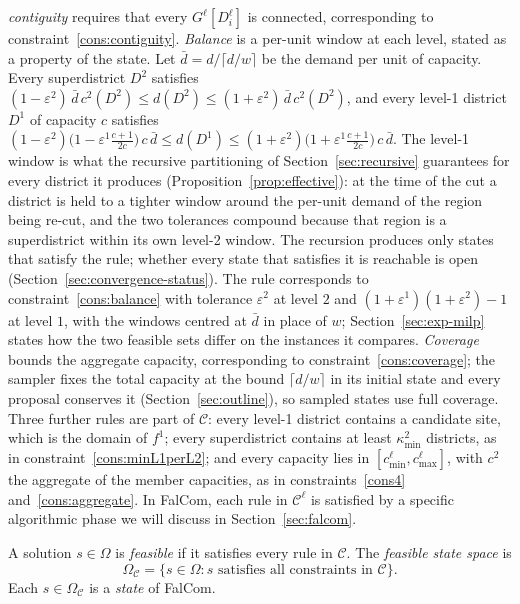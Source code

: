 \documentclass[preprint,12pt,authoryear]{elsarticle}
\theoremstyle{definition}
\begin{document}
\emph{contiguity} requires that every $G^\ell[D_i^\ell]$ is connected, corresponding to constraint~\eqref{cons:contiguity}. \emph{Balance} is a per-unit window at each level, stated as a property of the state. Let $\bar d = d/\lceil d/w\rceil$ be the demand per unit of capacity. Every superdistrict $D^2$ satisfies $(1{-}\varepsilon^2)\,\bar d\, c^2(D^2) \leq d(D^2) \leq (1{+}\varepsilon^2)\,\bar d\, c^2(D^2)$, and every level-1 district $D^1$ of capacity $c$ satisfies $(1{-}\varepsilon^2)\bigl(1 - \varepsilon^1\tfrac{c+1}{2c}\bigr)\, c\, \bar d \leq d(D^1) \leq (1{+}\varepsilon^2)\bigl(1 + \varepsilon^1\tfrac{c+1}{2c}\bigr)\, c\, \bar d$. The level-1 window is what the recursive partitioning of Section~\ref{sec:recursive} guarantees for every district it produces (Proposition~\ref{prop:effective}): at the time of the cut a district is held to a tighter window around the per-unit demand of the region being re-cut, and the two tolerances compound because that region is a superdistrict within its own level-2 window. The recursion produces only states that satisfy the rule; whether every state that satisfies it is reachable is open (Section~\ref{sec:convergence-status}). The rule corresponds to constraint~\eqref{cons:balance} with tolerance $\varepsilon^2$ at level $2$ and $(1{+}\varepsilon^1)(1{+}\varepsilon^2)-1$ at level $1$, with the windows centred at $\bar d$ in place of $w$; Section~\ref{sec:exp-milp} states how the two feasible sets differ on the instances it compares. \emph{Coverage} bounds the aggregate capacity, corresponding to constraint~\eqref{cons:coverage}; the sampler fixes the total capacity at the bound $\lceil d/w\rceil$ in its initial state and every proposal conserves it (Section~\ref{sec:outline}), so sampled states use full coverage. Three further rules are part of $\mathcal{C}$: every level-1 district contains a candidate site, which is the domain of $f^1$; every superdistrict contains at least $\kappa^2_{\min}$ districts, as in constraint~\eqref{cons:minL1perL2}; and every capacity lies in $[c^\ell_{\min}, c^\ell_{\max}]$, with $c^2$ the aggregate of the member capacities, as in constraints~\eqref{cons4} and~\eqref{cons:aggregate}. In FalCom, each rule in $\mathcal{C}^\ell$ is satisfied by a specific algorithmic phase we will discuss in Section~\ref{sec:falcom}.

A solution $s \in \Omega$ is \emph{feasible} if it satisfies every rule in
$\mathcal{C}$. The \emph{feasible state space} is
%
\begin{equation}\label{eq:feasible}
    \Omega_\mathcal{C} = \bigl\{ s \in \Omega :
    s \text{ satisfies all constraints in } \mathcal{C} \bigr\}.
\end{equation}
%
Each $s \in \Omega_\mathcal{C}$ is a \emph{state} of FalCom.
\end{document}
